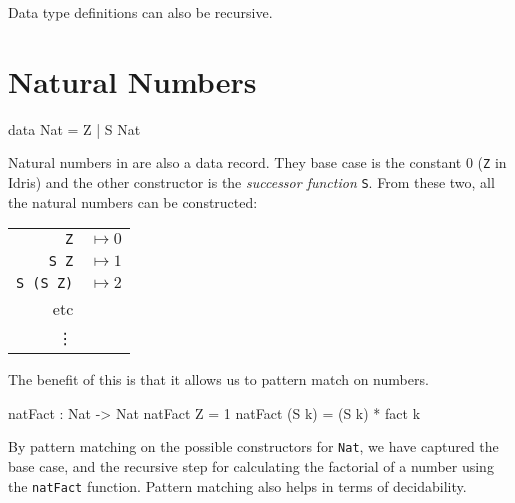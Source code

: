     Data type definitions can also be recursive.


\section{Natural Numbers}\label{des:nats}
    \begin{code}[caption={Natural numbers as defined in the \Idris prelude}]
        data Nat = Z | S Nat
    \end{code}

    Natural numbers in \Idris are also a data record. They base case is the constant 0 (\texttt{Z} in Idris) and the other constructor is the \textit{successor function} \texttt{S}. From these two, all the natural numbers can be constructed:
    
    \begin{tabular}{r l}
        \texttt{Z} & $\mapsto 0$ \\ 
        \texttt{S Z} & $\mapsto 1$ \\ 
        \texttt{S (S Z)} & $\mapsto 2$ \\
        etc & \\
        \vdots & \\
    \end{tabular}
    \par
    The benefit of this is that it allows us to pattern match on numbers.
    
    \begin{code}[caption={Pattern matching on \texttt{Nat}s}]
        natFact : Nat -> Nat
        natFact Z = 1
        natFact (S k) = (S k) * fact k
    \end{code}
    By pattern matching on the possible constructors for \texttt{Nat}, we have captured the base case, and the recursive step for calculating the factorial of a number using the \texttt{natFact} function.
    Pattern matching also helps in terms of decidability.
    \\


